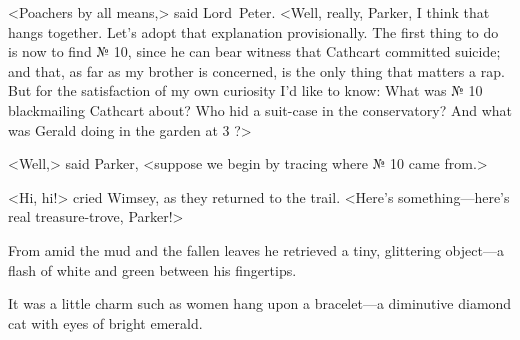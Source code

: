 <Poachers by all means,> said Lord~Peter. <Well, really, Parker, I think that hangs together. Let's adopt that explanation provisionally. The first thing to do is now to find № 10, since he can bear witness that Cathcart committed suicide; and that, as far as my brother is concerned, is the only thing that matters a rap. But for the satisfaction of my own curiosity I'd like to know: What was № 10 blackmailing Cathcart about? Who hid a suit-case in the conservatory? And what was Gerald doing in the garden at 3 ?>

<Well,> said Parker, <suppose we begin by tracing where № 10 came from.>

<Hi, hi!> cried Wimsey, as they returned to the trail. <Here's something—here's real treasure-trove, Parker!>

From amid the mud and the fallen leaves he retrieved a tiny, glittering object—a flash of white and green between his fingertips.

It was a little charm such as women hang upon a bracelet—a diminutive diamond cat with eyes of bright emerald.